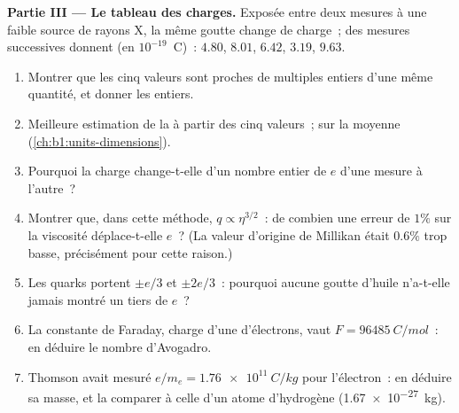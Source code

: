 \begin{problem}
\medskip
\noindent\textbf{Partie III --- Le tableau des charges.}
Exposée entre deux mesures à une faible source de rayons X, la même goutte
change de charge~; des mesures successives donnent (en $10^{-19}$~C)~:
$4.80$, $8.01$, $6.42$, $3.19$, $9.63$.
\begin{enumerate}[resume]
  \item Montrer que les cinq valeurs sont proches de multiples entiers d'une
        même quantité, et donner les entiers.
  \item Meilleure estimation de la  à partir des cinq
        valeurs~;  sur la moyenne (\cref{ch:b1:units-dimensions}).
  \item Pourquoi la charge change-t-elle d'un nombre entier de $e$ d'une
        mesure à l'autre~?
  \item Montrer que, dans cette méthode, $q \propto \eta^{3/2}$~: de combien une
        erreur de $1\%$ sur la viscosité déplace-t-elle $e$~? (La valeur
        d'origine de Millikan était $0.6\%$ trop basse, précisément pour cette raison.)
  \item Les quarks portent $\pm e/3$ et $\pm 2e/3$~: pourquoi aucune goutte
        d'huile n'a-t-elle jamais montré un tiers de $e$~?
  \item La constante de Faraday, charge d'une  d'électrons, vaut
        $F = \qty{96485}{C/mol}$~: en déduire le nombre d'Avogadro.
  \item Thomson avait mesuré $e/m_e = \qty{1.76e11}{C/kg}$ pour l'électron~:
        en déduire sa masse, et la comparer à celle d'un atome d'hydrogène
        (\qty{1.67e-27}{kg}).
\end{enumerate}


\end{problem}
